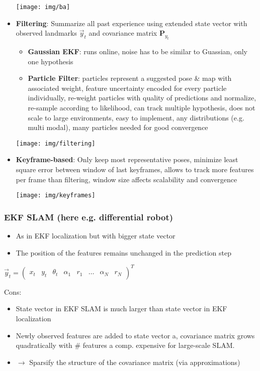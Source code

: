 \documentclass[fontsize=6pt]{scrartcl}
\newcommand{\mat}[1]{\mathbf{#1}}
\begin{document}
\begin{multicols*}{4}
\begin{itemize}
	{\centering
		\texttt{[image: img/ba]}
	\par}

	\item \textbf{Filtering}:
	Summarize all past experience using extended state vector with observed landmarks $\vec y_t$ and covariance matrix $\mat P_{y_t}$
	\begin{itemize}
		\item \textbf{Gaussian EKF}: runs online, noise has to be similar to Guassian, only one hypothesis
		\item \textbf{Particle Filter}: particles represent a suggested pose \& map with associated weight, feature uncertainty encoded for every particle individually, re-weight particles with quality of predictions and normalize, re-sample according to likelihood, can track multiple hypothesis, does not scale to large environments, easy to implement, any distributions (e.g. multi modal), many particles needed for good convergence
	\end{itemize}
	{\centering
		\texttt{[image: img/filtering]}
	\par}
	\item \textbf{Keyframe-based}: Only keep most representative poses, minimize least square error between window of last keyframes,	allows to track more features per frame than filtering,	window size affects scalability and convergence

	{\centering
		\texttt{[image: img/keyframes]}
	\par}
\end{itemize}

\subsubsection*{EKF SLAM (here e.g. differential robot)}
\begin{itemize}
	\item As in EKF localization but with bigger state vector
	\item The position of the features remains unchanged in the prediction step
\end{itemize}
{\centering
	$\vec y_t =
	\begin{pmatrix}
	x_t & y_t&\theta_t&\alpha_1&r_1&\ldots&\alpha_N&r_N
	\end{pmatrix}^T
	$
\par}

Cons:
\begin{itemize}
\item State vector in EKF SLAM is much larger than state vector in EKF localization
\item Newly observed features are added to state vector a, covariance matrix grows quadratically with \# features a comp. expensive for large-scale SLAM.
\item $\rightarrow$ Sparsify the structure of the covariance matrix (via approximations)
\end{itemize}


\end{multicols*}
\end{document}
